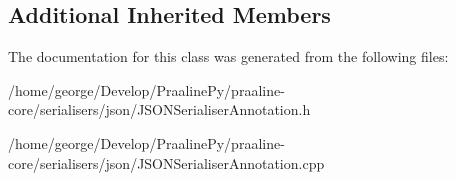 \subsection*{Additional Inherited Members}


The documentation for this class was generated from the following files\+:\begin{DoxyCompactItemize}
\item 
/home/george/\+Develop/\+Praaline\+Py/praaline-\/core/serialisers/json/J\+S\+O\+N\+Serialiser\+Annotation.\+h\item 
/home/george/\+Develop/\+Praaline\+Py/praaline-\/core/serialisers/json/J\+S\+O\+N\+Serialiser\+Annotation.\+cpp\end{DoxyCompactItemize}
